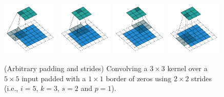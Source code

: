 \documentclass[notitlepage]{report}
\begin{document}
\begin{figure}[p]
    \centering
    \includegraphics[width=0.24\textwidth]{pdf/padding_strides_00.pdf}
    \includegraphics[width=0.24\textwidth]{pdf/padding_strides_01.pdf}
    \includegraphics[width=0.24\textwidth]{pdf/padding_strides_02.pdf}
    \includegraphics[width=0.24\textwidth]{pdf/padding_strides_03.pdf}
    \caption{\label{fig:padding_strides} (Arbitrary padding and strides)
        Convolving a $3 \times 3$ kernel over a $5 \times 5$ input padded with
        a $1 \times 1$ border of zeros using $2 \times 2$ strides (i.e.,
        $i = 5$, $k = 3$, $s = 2$ and $p = 1$).}
\end{figure}
\end{document}
